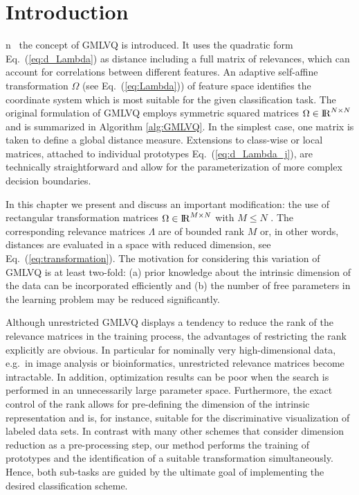 \section{Introduction}

n~\cite{Schneider2009a,Schneider2009b} the concept of \ac{GMLVQ} is introduced. 
It uses the quadratic form Eq.\ (\ref{eq:d_Lambda}) as distance including a full matrix of relevances, 
which can account for correlations between different features. 
An adaptive self-affine transformation $\Omega$ (see Eq.\ (\ref{eq:Lambda})) of feature space identifies the coordinate 
system which is most suitable for the given classification task. 
The original formulation of \ac{GMLVQ} employs symmetric squared  matrices $\Omega\in{\rm I\!R}^{N\times N}$ and 
is summarized in Algorithm \ref{alg:GMLVQ}. 
In the simplest case, one matrix is taken to define a global distance measure. 
Extensions to class-wise or local matrices, attached to individual prototypes Eq.\ (\ref{eq:d_Lambda_j}), 
are technically straightforward and allow for the parameterization of more complex decision boundaries. 

In this chapter we present and discuss an important modification: the use of rectangular transformation 
matrices $\Omega\in{\rm I\!R}^{M\times N}$ with $M\le N$ \cite{MLR0308Bunte2008a,Bunte2011_LiRaMLVQ}%
. 
The corresponding relevance matrices $\Lambda$ are of bounded rank $M$ or, in other words, distances are 
evaluated in a space with reduced dimension, see Eq.\ (\ref{eq:transformation}). 
The motivation for considering this variation of \ac{GMLVQ} is at least two-fold: 
(a) prior knowledge about the intrinsic dimension of the data can be incorporated efficiently and 
(b) the number of free parameters in the learning problem may be reduced significantly. 

Although unrestricted \ac{GMLVQ} displays a tendency to reduce the rank of the relevance matrices in the training process, 
the advantages of restricting the rank explicitly are obvious. 
In particular for nominally very high-dimensional data, e.g.\ in image analysis or bioinformatics, 
unrestricted relevance matrices become intractable. 
In addition, optimization results can be poor when the search is performed in an unnecessarily large parameter space. 
Furthermore, the exact control of the rank allows for pre-defining the dimension of the intrinsic representation and 
is, for instance, suitable for the discriminative visualization of labeled data sets. 
In contrast with many other schemes that consider dimension reduction as a pre-processing step, our method
performs the training of prototypes and the identification of a suitable transformation simultaneously. 
Hence, both sub-tasks are guided by the ultimate goal of implementing the desired classification scheme.  

